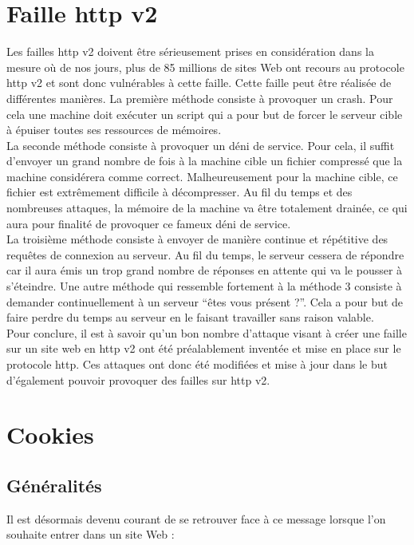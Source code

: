 \section{Faille http v2}

Les failles http v2 doivent être sérieusement prises en considération dans la mesure où de nos jours, plus de 85 millions de sites Web ont recours au protocole http v2 et sont donc vulnérables à cette faille.
Cette faille peut être réalisée de différentes manières.
La première méthode consiste à provoquer un crash. Pour cela une machine doit exécuter un script qui a pour but de forcer le serveur cible à épuiser toutes ses ressources de mémoires.\\
La seconde méthode consiste à provoquer un déni de service. Pour cela, il suffit d’envoyer un grand nombre de fois à la machine cible un fichier compressé que la machine considérera comme correct. Malheureusement pour la machine cible, ce fichier est extrêmement difficile à décompresser. Au fil du temps et des nombreuses attaques, la mémoire de la machine va être totalement drainée, ce qui aura pour finalité de provoquer ce fameux déni de service.\\
La troisième méthode consiste à envoyer de manière continue et répétitive des requêtes de connexion au serveur. Au fil du temps, le serveur cessera de répondre car il aura émis un trop grand nombre de réponses en attente qui va le pousser à s’éteindre.
Une autre méthode qui ressemble fortement à la méthode 3 consiste à demander continuellement à un serveur “êtes vous présent ?”. Cela a pour but de faire perdre du temps au serveur en le faisant travailler sans raison valable.\\
Pour conclure, il est à savoir qu'un bon nombre d’attaque visant à créer une faille sur un site web en http v2 ont été préalablement inventée et mise en place sur le protocole http. Ces attaques ont donc été modifiées et mise à jour dans le but d’également pouvoir provoquer des failles sur http v2.

\section{Cookies}

\subsection{Généralités}

Il est désormais devenu courant de se retrouver face à ce message lorsque l’on souhaite entrer dans un site Web :

